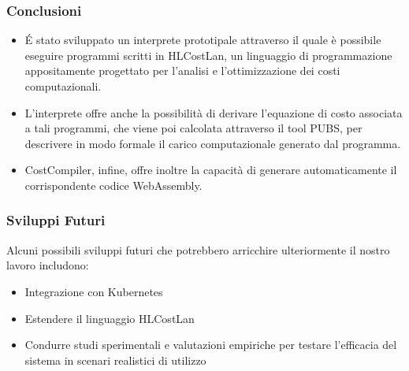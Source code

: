 \documentclass[xcolor=dvipsnames]{beamer}
\begin{document}
\begin{frame}
    \frametitle{Conclusioni}
    \begin{itemize}
        \item É stato sviluppato un \alert{interprete prototipale} attraverso il quale è possibile eseguire programmi scritti in HLCostLan, un linguaggio di programmazione appositamente progettato per l'analisi e l'ottimizzazione dei costi computazionali.
        \item L'interprete offre anche la possibilità di derivare \alert{l'equazione di costo} associata a tali programmi, che viene poi calcolata attraverso il tool PUBS, per descrivere in modo formale il carico computazionale generato dal programma.
        \item CostCompiler, infine, offre inoltre la capacità di generare automaticamente il corrispondente codice \alert{WebAssembly}.
    \end{itemize}
\end{frame}

\begin{frame}
    \frametitle{Sviluppi Futuri}
    Alcuni possibili sviluppi futuri che potrebbero arricchire ulteriormente il nostro lavoro includono:
    \begin{itemize}
        \item Integrazione con Kubernetes
        \item Estendere il linguaggio HLCostLan
        \item Condurre studi sperimentali e valutazioni empiriche per testare l'efficacia del sistema in scenari realistici di utilizzo
    \end{itemize}
    

\end{frame}
\end{document}
